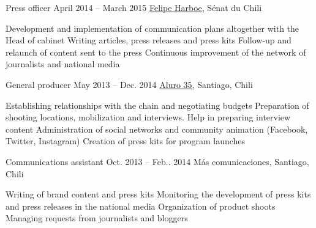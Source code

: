 %
%



\begin{joblist}




\item[Press officer]{April 2014 -- March 2015}
     { \href{https://www.harboe.cl/}{Felipe Harboe}, Sénat du Chili } 
	 {
			\iftbftiny \setlength{\parskip}{-10pt} \fi
			\begin{itemize}
			  \iftbftiny \setlength\itemsep{-3pt} \fi
			  \cvitem[\checkmark] Development and implementation of communication plans altogether with the Head of cabinet
			  \cvitem[\checkmark] Writing articles, press releases and press kits
			  \cvitem[\checkmark] Follow-up and relaunch of content sent to the press
			  \cvitem[\checkmark] Continuous improvement of the network of journalists and national media
			\end{itemize}     
	}
    
    
    
\item[General producer]{May 2013 -- Dec. 2014}
     {\href{https://www.aluro35.com/}  {Aluro 35}, Santiago, Chili}
     {	
			\iftbftiny \setlength{\parskip}{-10pt} \fi
			\begin{itemize}
			  \iftbftiny \setlength\itemsep{-3pt} \fi
			  \cvitem[\checkmark] Establishing relationships with the chain and negotiating budgets
			  \cvitem[\checkmark] Preparation of shooting locations, mobilization and interviews. Help in preparing interview content
			  \cvitem[\checkmark] Administration of social networks and community animation (Facebook, Twitter, Instagram)
			  \cvitem[\checkmark] Creation of press kits for program launches
			\end{itemize}     
	}



\item[Communications assistant]{Oct. 2013 -- Feb.. 2014 }     
  	{Más comunicaciones, Santiago, Chili}     
  	{
		\iftbftiny \setlength{\parskip}{-10pt} \fi
		\begin{itemize}
			  \iftbftiny \setlength\itemsep{-3pt} \fi
			  \cvitem[\checkmark] Writing of brand content and press kits
			  \cvitem[\checkmark] Monitoring the development of press kits and press releases in the national media
			  \cvitem[\checkmark] Organization of product shoots
			  \cvitem[\checkmark] Managing requests from journalists and bloggers
		\end{itemize}       
	}





\end{joblist}

